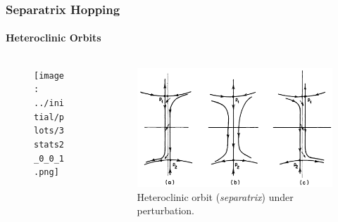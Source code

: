 \documentclass[dvipsnames]{beamer}
\begin{document}
\begin{frame}
    \frametitle{Separatrix Hopping}
    \framesubtitle{Heteroclinic Orbits}

    \begin{columns}
        \begin{column}{0.47\textwidth}
            \begin{figure}[t]
                \centering
                \texttt{[image: ../initial/plots/3stats2\_0\_0\_1.png]}
            \end{figure}
        \end{column}
        \begin{column}{0.47\textwidth}
            \begin{figure}[t]
                \centering
                \includegraphics[width=\textwidth]{plots/heteroclinic.png}
                \caption{Heteroclinic orbit (\emph{separatrix}) under perturbation.}
            \end{figure}
        \end{column}
    \end{columns}
\end{frame}
\end{document}
